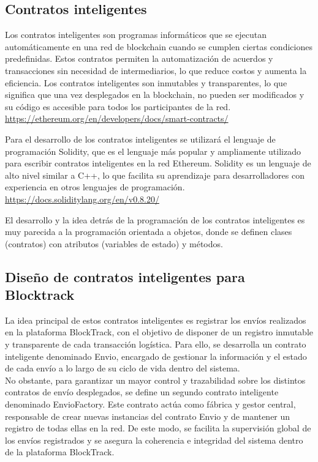 \subsection{Contratos inteligentes}
Los contratos inteligentes son programas informáticos que se ejecutan automáticamente en una red de blockchain
cuando se cumplen ciertas condiciones predefinidas. Estos contratos permiten la automatización de acuerdos y
transacciones sin necesidad de intermediarios, lo que reduce costos y aumenta la eficiencia. Los contratos
inteligentes son inmutables y transparentes, lo que significa que una vez desplegados en la blockchain,
no pueden ser modificados y su código es accesible para todos los participantes de la red. \hyperlink{smartcontracts}{https://ethereum.org/en/developers/docs/smart-contracts/}

Para el desarrollo de los contratos inteligentes se utilizará el lenguaje de programación Solidity, que es el lenguaje
más popular y ampliamente utilizado para escribir contratos inteligentes en la red Ethereum. Solidity es un
lenguaje de alto nivel similar a C++, lo que facilita su aprendizaje para desarrolladores con experiencia en
otros lenguajes de programación. \hyperlink{solidity}{https://docs.soliditylang.org/en/v0.8.20/}

El desarrollo y la idea detrás de la programación de los contratos inteligentes es muy parecida a la programación
orientada a objetos, donde se definen clases (contratos) con atributos (variables de estado) y métodos.

\subsection{Diseño de contratos inteligentes para Blocktrack}
La idea principal de estos contratos inteligentes es registrar los envíos realizados en la plataforma BlockTrack, 
con el objetivo de disponer de un registro inmutable y transparente de cada transacción logística. Para ello,
se desarrolla un contrato inteligente denominado Envio, encargado de gestionar la información y el 
estado de cada envío a lo largo de su ciclo de vida dentro del sistema.\\

No obstante, para garantizar un mayor control y trazabilidad sobre los distintos contratos de envío desplegados, 
se define un segundo contrato inteligente denominado EnvioFactory. Este contrato actúa como fábrica y gestor central, 
responsable de crear nuevas instancias del contrato Envio y de mantener un registro de todas ellas en la red. 
De este modo, se facilita la supervisión global de los envíos registrados y se asegura la coherencia e 
integridad del sistema dentro de la plataforma BlockTrack.\\

